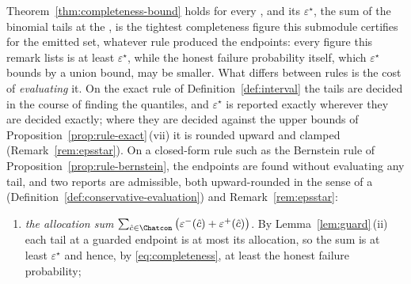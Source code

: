 
\begin{remark}\label{rem:completeness-on-rules}
Theorem~\ref{thm:completeness-bound} holds for every , and
its $\varepsilon^{\star}$, the sum of the binomial tails at the
, is the tightest completeness figure this submodule
certifies for the emitted set, whatever rule produced the endpoints: every
figure this remark lists is at least $\varepsilon^{\star}$, while the honest failure
probability itself, which $\varepsilon^{\star}$ bounds by a union bound, may
be smaller. What differs between rules is
the cost of \emph{evaluating} it. On the exact rule of
Definition~\ref{def:interval} the tails are decided in the course of finding
the quantiles, and $\varepsilon^{\star}$ is reported exactly wherever they are
decided exactly; where they are decided against the upper bounds of
Proposition~\ref{prop:rule-exact}\,(vii) it is rounded upward and clamped
(Remark~\ref{rem:epsstar}). On a closed-form rule such as the Bernstein rule
of Proposition~\ref{prop:rule-bernstein}, the endpoints are found without
evaluating any tail, and two reports are admissible, both upward-rounded in
the sense of a 
(Definition~\ref{def:conservative-evaluation}) and Remark~\ref{rem:epsstar}:
\begin{enumerate}[label=(\alph*),leftmargin=2.2em]
\item \emph{the allocation sum}
$\sum_{\hat c\in\Chatcon}\big(\varepsilon^{-}(\hat c)+\varepsilon^{+}(\hat
c)\big)$. By Lemma~\ref{lem:guard}\,(ii) each tail at a guarded endpoint is
at most its allocation, so the sum is at least $\varepsilon^{\star}$ and
hence, by \eqref{eq:completeness}, at least the honest failure probability;

\end{enumerate}
\end{remark}
